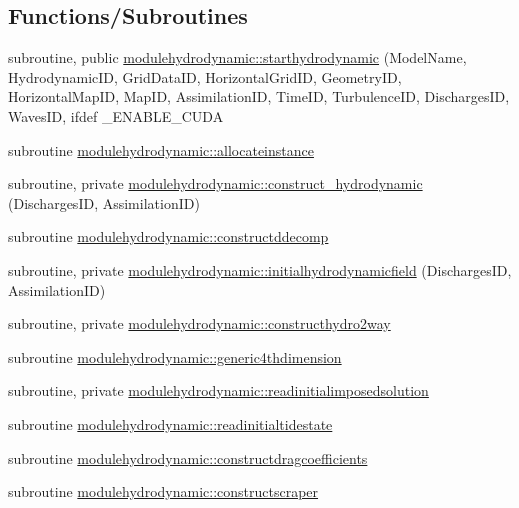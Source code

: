\subsection*{Functions/\+Subroutines}
\begin{DoxyCompactItemize}
\item 
subroutine, public \mbox{\hyperlink{namespacemodulehydrodynamic_a5f577b4eaf3f21452c288af53dcffb69}{modulehydrodynamic\+::starthydrodynamic}} (Model\+Name, Hydrodynamic\+ID, Grid\+Data\+ID, Horizontal\+Grid\+ID, Geometry\+ID, Horizontal\+Map\+ID, Map\+ID, Assimilation\+ID, Time\+ID, Turbulence\+ID, Discharges\+ID, Waves\+ID, ifdef \+\_\+\+E\+N\+A\+B\+L\+E\+\_\+\+C\+U\+DA
\item 
subroutine \mbox{\hyperlink{namespacemodulehydrodynamic_aacffef10ed59e5eb96916e7a72dbff26}{modulehydrodynamic\+::allocateinstance}}
\item 
subroutine, private \mbox{\hyperlink{namespacemodulehydrodynamic_a71f29b5c93f202c8e783ecb892b1b497}{modulehydrodynamic\+::construct\+\_\+hydrodynamic}} (Discharges\+ID, Assimilation\+ID)
\item 
subroutine \mbox{\hyperlink{namespacemodulehydrodynamic_ac05ecc81fa8270b9ed0247f513b0c5d9}{modulehydrodynamic\+::constructddecomp}}
\item 
subroutine, private \mbox{\hyperlink{namespacemodulehydrodynamic_a4627a0c2583b12e5490b0ddf81573972}{modulehydrodynamic\+::initialhydrodynamicfield}} (Discharges\+ID, Assimilation\+ID)
\item 
subroutine, private \mbox{\hyperlink{namespacemodulehydrodynamic_ab991fa8b939ae331f5361fbce83a2ed9}{modulehydrodynamic\+::constructhydro2way}}
\item 
subroutine \mbox{\hyperlink{namespacemodulehydrodynamic_a1edb0b24590f8074445b2a82f3bf1daf}{modulehydrodynamic\+::generic4thdimension}}
\item 
subroutine, private \mbox{\hyperlink{namespacemodulehydrodynamic_a8c1095168f036a4615b7ef4ad633717b}{modulehydrodynamic\+::readinitialimposedsolution}}
\item 
subroutine \mbox{\hyperlink{namespacemodulehydrodynamic_ac4bc667c44ab1d14eaa3efa39b224aa1}{modulehydrodynamic\+::readinitialtidestate}}
\item 
subroutine \mbox{\hyperlink{namespacemodulehydrodynamic_ae2c9c19e22a3490a8d02e575bf8dd5a7}{modulehydrodynamic\+::constructdragcoefficients}}
\item 
subroutine \mbox{\hyperlink{namespacemodulehydrodynamic_aced773f111ad70fa9ce5069abbc8a7eb}{modulehydrodynamic\+::constructscraper}}

\end{DoxyCompactItemize}

